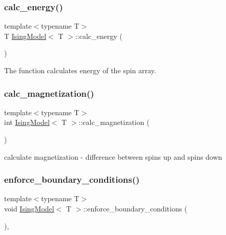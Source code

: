 \subsubsection{\texorpdfstring{calc\+\_\+energy()}{calc\_energy()}}
{\footnotesize\ttfamily template$<$typename T$>$ \\
T \mbox{\hyperlink{classIsingModel}{Ising\+Model}}$<$ T $>$\+::calc\+\_\+energy (\begin{DoxyParamCaption}{ }\end{DoxyParamCaption})\hspace{0.3cm}{\ttfamily [inline]}}



The function calculates energy of the spin array. 

\mbox{\label{classIsingModel_a349a13b847fb221eec7043fc53649640}} 
\subsubsection{\texorpdfstring{calc\+\_\+magnetization()}{calc\_magnetization()}}
{\footnotesize\ttfamily template$<$typename T$>$ \\
int \mbox{\hyperlink{classIsingModel}{Ising\+Model}}$<$ T $>$\+::calc\+\_\+magnetization (\begin{DoxyParamCaption}{ }\end{DoxyParamCaption})\hspace{0.3cm}{\ttfamily [inline]}}



calculate magnetization -\/ difference between spins up and spins down 

\mbox{\label{classIsingModel_abe2a720ca3ed7dde191e36fbf33561b3}} 
\subsubsection{\texorpdfstring{enforce\+\_\+boundary\+\_\+conditions()}{enforce\_boundary\_conditions()}}
{\footnotesize\ttfamily template$<$typename T$>$ \\
void \mbox{\hyperlink{classIsingModel}{Ising\+Model}}$<$ T $>$\+::enforce\+\_\+boundary\+\_\+conditions (\begin{DoxyParamCaption}{ }\end{DoxyParamCaption})\hspace{0.3cm}{\ttfamily [inline]}, {\ttfamily [private]}}



